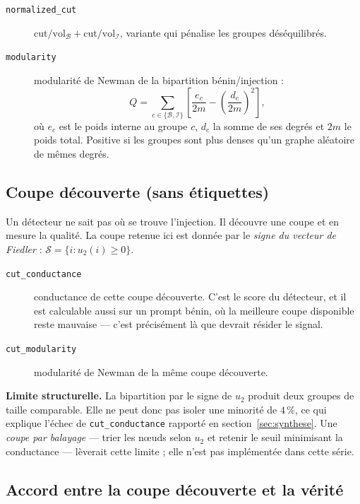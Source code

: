 \documentclass[11pt,a4paper]{article}
\begin{document}
\begin{description}
\item[\texttt{normalized\_cut}]
  $\mathrm{cut}/\mathrm{vol}_{\mathcal{B}} + \mathrm{cut}/\mathrm{vol}_{\mathcal{I}}$,
  variante qui pénalise les groupes déséquilibrés.

\item[\texttt{modularity}] modularité de Newman de la bipartition
  bénin/injection :
  \[
    Q = \sum_{c \in \{\mathcal{B},\mathcal{I}\}}
        \left[\frac{e_c}{2m} - \left(\frac{d_c}{2m}\right)^{2}\right],
  \]
  où $e_c$ est le poids interne au groupe $c$, $d_c$ la somme de ses degrés et
  $2m$ le poids total. Positive si les groupes sont plus denses qu'un graphe
  aléatoire de mêmes degrés.
\end{description}

\subsection{Coupe découverte (sans étiquettes)}

Un détecteur ne sait pas où se trouve l'injection. Il découvre une coupe et en
mesure la qualité. La coupe retenue ici est donnée par le \emph{signe du
vecteur de Fiedler} : $\mathcal{S} = \{i : u_2(i) \ge 0\}$.

\begin{description}
\item[\texttt{cut\_conductance}] conductance de cette coupe découverte. C'est
  le score du détecteur, et il est calculable aussi sur un prompt bénin, où la
  meilleure coupe disponible reste mauvaise --- c'est précisément là que
  devrait résider le signal.

\item[\texttt{cut\_modularity}] modularité de Newman de la même coupe
  découverte.
\end{description}

\noindent \textbf{Limite structurelle.} La bipartition par le signe de $u_2$
produit deux groupes de taille comparable. Elle ne peut donc pas isoler une
minorité de $4\,\%$, ce qui explique l'échec de \texttt{cut\_conductance}
rapporté en section~\ref{sec:synthese}. Une \emph{coupe par balayage} --- trier
les n\oe uds selon $u_2$ et retenir le seuil minimisant la conductance ---
lèverait cette limite ; elle n'est pas implémentée dans cette série.

\subsection{Accord entre la coupe découverte et la vérité}
\end{document}
